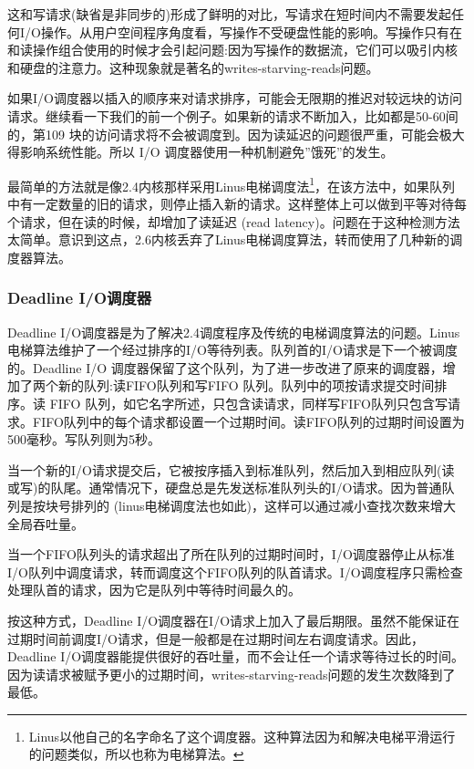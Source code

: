 这和写请求(缺省是非同步的)形成了鲜明的对比，写请求在短时间内不需要发起任何I/O操作。从用户空间程序角度看，写操作不受硬盘性能的影响。写操作只有在和读操作组合使用的时候才会引起问题:因为写操作的数据流，它们可以吸引内核和硬盘的注意力。这种现象就是著名的writes-starving-reads问题。

如果I/O调度器以插入的顺序来对请求排序，可能会无限期的推迟对较远块的访问请求。继续看一下我们的前一个例子。如果新的请求不断加入，比如都是50-60间的，第109 块的访问请求将不会被调度到。因为读延迟的问题很严重，可能会极大得影响系统性能。所以 I/O 调度器使用一种机制避免''饿死''的发生。

最简单的方法就是像2.4内核那样采用Linus电梯调度法\footnote[1]{Linus以他自己的名字命名了这个调度器。这种算法因为和解决电梯平滑运行的问题类似，所以也称为电梯算法。}，在该方法中，如果队列中有一定数量的旧的请求，则停止插入新的请求。这样整体上可以做到平等对待每个请求，但在读的时候，却增加了读延迟 (read latency)。问题在于这种检测方法太简单。意识到这点，2.6内核丢弃了Linus电梯调度算法，转而使用了几种新的调度器算法。

\subsubsection{Deadline I/O调度器}

Deadline I/O调度器是为了解决2.4调度程序及传统的电梯调度算法的问题。Linus电梯算法维护了一个经过排序的I/O等待列表。队列首的I/O请求是下一个被调度的。Deadline I/O 调度器保留了这个队列，为了进一步改进了原来的调度器，增加了两个新的队列:读FIFO队列和写FIFO 队列。队列中的项按请求提交时间排序。读 FIFO 队列，如它名字所述，只包含读请求，同样写FIFO队列只包含写请求。FIFO队列中的每个请求都设置一个过期时间。读FIFO队列的过期时间设置为500毫秒。写队列则为5秒。

当一个新的I/O请求提交后，它被按序插入到标准队列，然后加入到相应队列(读或写)的队尾。通常情况下，硬盘总是先发送标准队列头的I/O请求。因为普通队列是按块号排列的 (linus电梯调度法也如此)，这样可以通过减小查找次数来增大全局吞吐量。

当一个FIFO队列头的请求超出了所在队列的过期时间时，I/O调度器停止从标准I/O队列中调度请求，转而调度这个FIFO队列的队首请求。I/O调度程序只需检查处理队首的请求，因为它是队列中等待时间最久的。

按这种方式，Deadline I/O调度器在I/O请求上加入了最后期限。虽然不能保证在过期时间前调度I/O请求，但是一般都是在过期时间左右调度请求。因此，Deadline I/O调度器能提供很好的吞吐量，而不会让任一个请求等待过长的时间。因为读请求被赋予更小的过期时间，writes-starving-reads问题的发生次数降到了最低。

